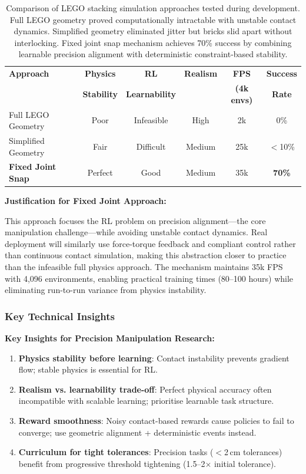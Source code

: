 \documentclass[12pt,a4paper,oneside]{report}
\begin{document}
\begin{table}[h]
\centering
\small
\begin{tabular}{|l|c|c|c|c|c|}
\hline
\textbf{Approach} & \textbf{Physics} & \textbf{RL} & \textbf{Realism} & \textbf{FPS} & \textbf{Success} \\
 & \textbf{Stability} & \textbf{Learnability} & & \textbf{(4k envs)} & \textbf{Rate} \\
\hline
Full LEGO Geometry & Poor & Infeasible & High & 2k & 0\% \\
Simplified Geometry & Fair & Difficult & Medium & 25k & $<$10\% \\
\textbf{Fixed Joint Snap} & Perfect & Good & Medium & 35k & \textbf{70\%} \\
\hline
\end{tabular}
\caption{Comparison of LEGO stacking simulation approaches tested during development. Full LEGO geometry proved computationally intractable with unstable contact dynamics. Simplified geometry eliminated jitter but bricks slid apart without interlocking. Fixed joint snap mechanism achieves 70\% success by combining learnable precision alignment with deterministic constraint-based stability.}
\end{table}

\textbf{Justification for Fixed Joint Approach:}

This approach focuses the RL problem on precision alignment---the core manipulation challenge---while avoiding unstable contact dynamics. Real deployment will similarly use force-torque feedback and compliant control rather than continuous contact simulation, making this abstraction closer to practice than the infeasible full physics approach. The mechanism maintains 35k FPS with 4{,}096 environments, enabling practical training times (80--100 hours) while eliminating run-to-run variance from physics instability.

\subsubsection{Key Technical Insights}

\textbf{Key Insights for Precision Manipulation Research:}
\begin{enumerate}
    \item \textbf{Physics stability before learning}: Contact instability prevents gradient flow; stable physics is essential for RL.
    \item \textbf{Realism vs. learnability trade-off}: Perfect physical accuracy often incompatible with scalable learning; prioritise learnable task structure.
    \item \textbf{Reward smoothness}: Noisy contact-based rewards cause policies to fail to converge; use geometric alignment + deterministic events instead.
    \item \textbf{Curriculum for tight tolerances}: Precision tasks ($<$2\,cm tolerances) benefit from progressive threshold tightening (1.5--2$\times$ initial tolerance).
\end{enumerate}
\end{document}
